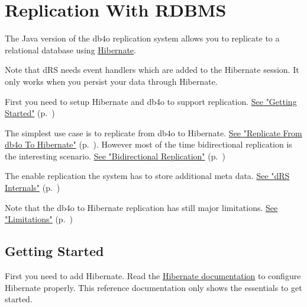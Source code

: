 
\chapter{Replication With RDBMS}
\label{drs:db4o-replication-system-drs-replication-with-rdbms}

The Java version of the db4o replication system allows you to replicate to a relational database using \href{http://www.hibernate.org/}{Hibernate}.

Note that dRS needs event handlers which are added to the Hibernate session. It only works when you persist your data through Hibernate.

First you need to setup Hibernate and db4o to support replication. \hyperref[drs:db4o-replication-system-drs-db4o-rdbms-getting-started]{See "Getting Started"} (p.~\pageref{drs:db4o-replication-system-drs-db4o-rdbms-getting-started})

The simplest use case is to replicate from db4o to Hibernate. \hyperref[drs:db4o-replication-system-drs-db4o-rdbms-db4o-to-rdbms]{See "Replicate From db4o To Hibernate"} (p.~\pageref{drs:db4o-replication-system-drs-db4o-rdbms-db4o-to-rdbms}). However most of the time bidirectional replication is the interesting scenario. \hyperref[drs:db4o-replication-system-drs-db4o-rdbms-bi-directional]{See "Bidirectional Replication"} (p.~\pageref{drs:db4o-replication-system-drs-db4o-rdbms-bi-directional})

The enable replication the system has to store additional meta data. \hyperref[drs:db4o-replication-system-drs-db4o-rdbms-drs-internals]{See "dRS Internals"} (p.~\pageref{drs:db4o-replication-system-drs-db4o-rdbms-drs-internals})

Note that the db4o to Hibernate replication has still major limitations. \hyperref[drs:db4o-replication-system-drs-db4o-rdbms-limitations]{See "Limitations"} (p.~\pageref{drs:db4o-replication-system-drs-db4o-rdbms-limitations})

\section{Getting Started}
\label{drs:db4o-replication-system-drs-db4o-rdbms-getting-started}

First you need to add Hibernate. Read the \href{http://www.hibernate.org/docs}{Hibernate documentation} to configure Hibernate properly. This reference documentation only shows the essentials to get started.


